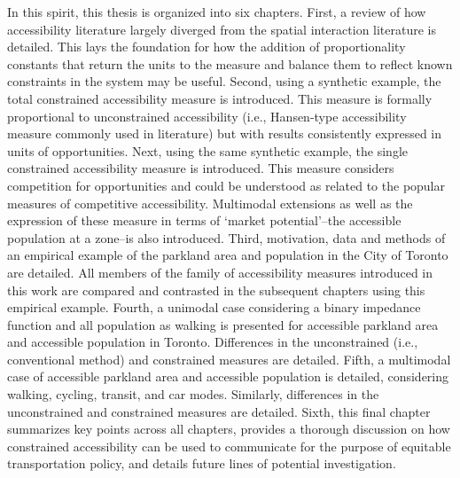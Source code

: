 \documentclass[
11pt, %
oneside, %
english, %
singlespacing, %
]{macthesis} %
\def\blankpage{%
      \clearpage%
      \thispagestyle{empty}%
      \addtocounter{page}{-1}%
      \null%
      \clearpage}
\begin{document}
In this spirit, this thesis is organized into six chapters. First, a review of how accessibility literature largely diverged from the spatial interaction literature is detailed. This lays the foundation for how the addition of proportionality constants that return the units to the measure and balance them to reflect known constraints in the system may be useful. Second, using a synthetic example, the total constrained accessibility measure is introduced. This measure is formally proportional to unconstrained accessibility (i.e., Hansen-type accessibility measure commonly used in literature) but with results consistently expressed in units of opportunities. Next, using the same synthetic example, the single constrained accessibility measure is introduced. This measure considers competition for opportunities and could be understood as related to the popular measures of competitive accessibility. Multimodal extensions as well as the expression of these measure in terms of `market potential'--the accessible population at a zone--is also introduced. Third, motivation, data and methods of an empirical example of the parkland area and population in the City of Toronto are detailed. All members of the family of accessibility measures introduced in this work are compared and contrasted in the subsequent chapters using this empirical example. Fourth, a unimodal case considering a binary impedance function and all population as walking is presented for accessible parkland area and accessible population in Toronto. Differences in the unconstrained (i.e., conventional method) and constrained measures are detailed. Fifth, a multimodal case of accessible parkland area and accessible population is detailed, considering walking, cycling, transit, and car modes. Similarly, differences in the unconstrained and constrained measures are detailed. Sixth, this final chapter summarizes key points across all chapters, provides a thorough discussion on how constrained accessibility can be used to communicate for the purpose of equitable transportation policy, and details future lines of potential investigation.
\blankpage
\clearpage

\end{document}
